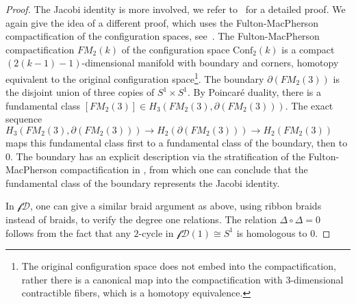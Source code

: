 \documentclass{scrartcl}
\theoremstyle{plain}
\theoremstyle{definition}
\newcommand{\comp}{\circ}
\begin{document}
\begin{proof}
    The Jacobi identity is more involved, we refer to~\cite{sinha2010homology} for a detailed proof. We again give the idea of a different proof, which uses the Fulton-MacPherson compactification of the configuration spaces, see~\cite{sinha2004manifold}. The Fulton-MacPherson compactification $FM_2(k)$ of the configuration space $\mathrm{Conf}_2(k)$ is a compact $(2(k-1)-1)$-dimensional manifold with boundary and corners, homotopy equivalent to the original configuration space\footnote{The original configuration space does not embed into the compactification, rather there is a canonical map into the compactification with $3$-dimensional contractible fibers, which is a homotopy equivalence. }. The boundary $\partial (FM_2(3))$ is the disjoint union of three copies of $S^1\times S^1$. By Poincaré duality, there is a fundamental class $[FM_2(3)]\in H_3(FM_2(3), \partial (FM_2(3)))$. The exact sequence $H_3(FM_2(3), \partial (FM_2(3))) \to H_2(\partial (FM_2(3))) \to H_2(FM_2(3))$ maps this fundamental class first to a fundamental class of the boundary, then to $0$. The boundary has an explicit description via the stratification of the Fulton-MacPherson compactification in \cite{sinha2010homology}, from which one can conclude that the  fundamental class of the boundary represents the Jacobi identity. 
    
    In $\mathcal {fD}$, one can give a similar braid argument as above, using ribbon braids instead of braids, to verify the degree one relations. The relation $\Delta\comp \Delta = 0$ follows from the fact that any $2$-cycle in $\mathcal {fD}(1) \cong S^1$ is homologous to $0$.
\end{proof}
\end{document}
